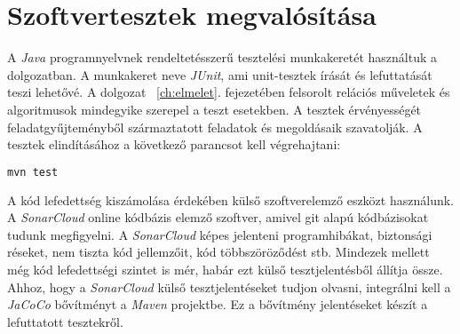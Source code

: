 \section{Szoftvertesztek megvalósítása}

A \textit{Java} programnyelvnek rendeltetésszerű tesztelési munkakeretét használtuk a dolgozatban. A munkakeret neve \textit{JUnit}, ami unit-tesztek írását és lefuttatását teszi lehetővé. A dolgozat ~\ref{ch:elmelet}. fejezetében felsorolt relációs műveletek és algoritmusok mindegyike szerepel a teszt esetekben. A tesztek érvényességét feladatgyűjteményből \parencite{kordic2018} származtatott feladatok és megoldásaik szavatolják. A tesztek elindításához a következő parancsot kell végrehajtani:

\linespread{1}
\begin{lstlisting}[language=sh]
mvn test
\end{lstlisting}

A kód lefedettség kiszámolása érdekében külső szoftverelemző eszközt használunk. A \textit{SonarCloud} online kódbázis elemző szoftver, amivel git alapú kódbázisokat tudunk megfigyelni. A \textit{SonarCloud} képes jelenteni programhibákat, biztonsági réseket, nem tiszta kód jellemzőit, kód többszöröződést stb. Mindezek mellett még kód lefedettségi szintet is mér, habár ezt külső tesztjelentésből állítja össze. Ahhoz, hogy a \textit{SonarCloud} külső tesztjelentéseket tudjon olvasni, integrálni kell a \textit{JaCoCo} bővítményt a \textit{Maven} projektbe. Ez a bővítmény jelentéseket készít a lefuttatott tesztekről.
